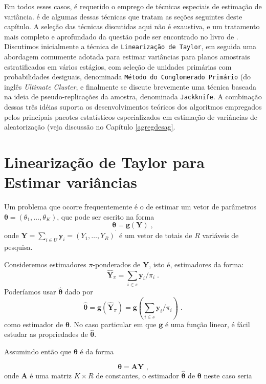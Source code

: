 \documentclass[]{book}
\theoremstyle{definition}
\theoremstyle{definition}
\theoremstyle{definition}
\theoremstyle{remark}
\begin{document}
Em todos esses casos, é requerido o emprego de técnicas especiais de
estimação de variância. é de algumas dessas técnicas que tratam as
seções seguintes deste capítulo. A seleção das técnicas discutidas aqui
não é exaustiva, e um tratamento mais completo e aprofundado da questão
pode ser encontrado no livro de \citep{W85}. Discutimos inicialmente a
técnica de \texttt{Linearização\ de\ Taylor}, em seguida uma abordagem
comumente adotada para estimar variâncias para planos amostrais
estratificados em vários estágios, com seleção de unidades primárias com
probabilidades desiguais, denominada
\texttt{Método\ do\ Conglomerado\ Primário} (do inglês \emph{Ultimate
Cluster}, e finalmente se discute brevemente uma técnica baseada na
ideia de pseudo-replicações da amostra, denominada \texttt{Jackknife}. A
combinação dessas três idéias suporta os desenvolvimentos teóricos dos
algoritmos empregados pelos principais pacotes estatísticos
especializados em estimação de variâncias de aleatorização (veja
discussão no Capítulo \ref{agregdesag}.

\section{Linearização de Taylor para Estimar variâncias}\label{taylor}

Um problema que ocorre frequentemente é o de estimar um vetor de
parâmetros
\(\mathbf{\theta =}\left( \theta _{1},\ldots ,\theta_{K}\right)\), que
pode ser escrito na forma \[
\mathbf{\theta }=\mathbf{g}(\mathbf{Y})\;, 
\] onde
\(\mathbf{Y}=\sum_{i\in U}\mathbf{y}_{i}=(Y_{1},\ldots ,Y_{R})^{^{\prime}}\)
é um vetor de totais de \(R\) variáveis de pesquisa.

Consideremos estimadores \(\pi\)-ponderados de \(\mathbf{Y}\), isto é,
estimadores da forma: \[
\widehat{\mathbf{Y}}_{\pi }=\sum_{i\in s}\mathbf{y}_{i}/\pi _{i}\;. 
\] Poderíamos usar \(\mathbf{\hat{\theta}}\) dado por \[
\mathbf{\hat{\theta}}=\mathbf{g}\left( \widehat{\mathbf{Y}}_{\pi }\right) =\mathbf{g}(\sum_{i\in s}\mathbf{y}_{i}/\pi _{i})\;. 
\] como estimador de \(\mathbf{\theta}\). No caso particular em que
\(\mathbf{g}\) é uma função linear, é fácil estudar as propriedades de
\(\mathbf{\hat{\theta}}\).

Assumindo então que \(\mathbf{\theta}\) é da forma

\[
\mathbf{\theta }=\mathbf{AY}\mbox{ ,} 
\] onde \(\mathbf{A}\) é uma matriz \(K\times R\) de constantes, o
estimador \(\mathbf{\hat{\theta}}\) de \(\mathbf{\theta }\) neste caso
seria
\end{document}

